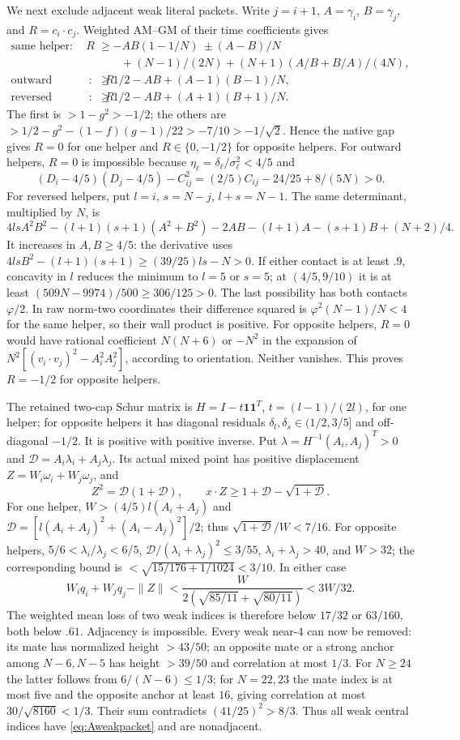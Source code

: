 \documentclass[11pt]{article}
\theoremstyle{remark}
\newcommand{\ph}{\varphi}
\begin{document}
We next exclude adjacent weak literal packets. Write $j=i+1$,
$A=\gamma_i$, $B=\gamma_j$, and $R=c_i\cdot c_j$.
Weighted AM--GM of their time coefficients gives
\[
\begin{aligned}
\text{same helper}:\quad R&\ge-AB(1-1/N)\ \pm(A-B)/N\\
 &\qquad +(N-1)/(2N)+(N+1)(A/B+B/A)/(4N),\\
\text{outward helpers}:\quad R&\ge1/2-AB+(A-1)(B-1)/N,\\
\text{reversed helpers}:\quad R&\ge1/2-AB+(A+1)(B+1)/N.
\end{aligned}
\]
The first is $>1-g^2>-1/2$; the others are
$>1/2-g^2-(1-f)(g-1)/22>-7/10>-1/\sqrt2$.
Hence the native gap gives $R=0$ for one helper and
$R\in\{0,-1/2\}$ for opposite helpers.
For outward helpers, $R=0$ is impossible because
$\eta_\ell=\delta_\ell/\sigma_\ell^2<4/5$ and
\[
 (D_i-4/5)(D_j-4/5)-C_{ij}^2
       =(2/5)C_{ij}-24/25+8/(5N)>0.
\]
For reversed helpers, put $l=i$, $s=N-j$, $l+s=N-1$.
The same determinant, multiplied by $N$, is
\[
 4lsA^2B^2-(l+1)(s+1)(A^2+B^2)-2AB
 -(l+1)A-(s+1)B+(N+2)/4.
\]
It increases in $A,B\ge4/5$: the derivative uses
$4lsB^2-(l+1)(s+1)\ge(39/25)ls-N>0$.
If either contact is at least $.9$, concavity in $l$ reduces the
minimum to $l=5$ or $s=5$; at $(4/5,9/10)$ it is at least
$(509N-9974)/500\ge306/125>0$.
The last possibility has both contacts $\ph/2$.
In raw norm-two coordinates their difference squared is
$\ph^2(N-1)/N<4$ for the same helper, so their wall product is
positive. For opposite helpers, $R=0$ would have rational coefficient
$N(N+6)$ or $-N^2$ in the expansion of
$N^2[(v_i\cdot v_j)^2-A_i^2A_j^2]$, according to orientation.
Neither vanishes. This proves $R=-1/2$ for opposite helpers.

The retained two-cap Schur matrix is
$H=I-t\mathbf1\mathbf1^T$, $t=(l-1)/(2l)$, for one helper;
for opposite helpers it has diagonal residuals
$\delta_l,\delta_s\in(1/2,3/5]$ and off-diagonal $-1/2$.
It is positive with positive inverse. Put
$\lambda=H^{-1}(A_i,A_j)^T>0$ and
$\mathcal D=A_i\lambda_i+A_j\lambda_j$.
Its actual mixed point has positive displacement
$Z=W_i\omega_i+W_j\omega_j$, and
\[
 Z^2=\mathcal D(1+\mathcal D),\qquad
 x\cdot Z\ge1+\mathcal D-\sqrt{1+\mathcal D}.
\]
For one helper, $W>(4/5)l(A_i+A_j)$ and
$\mathcal D=[l(A_i+A_j)^2+(A_i-A_j)^2]/2$;
thus $\sqrt{1+\mathcal D}/W<7/16$.
For opposite helpers, $5/6<\lambda_i/\lambda_j<6/5$,
$\mathcal D/(\lambda_i+\lambda_j)^2\le3/55$,
$\lambda_i+\lambda_j>40$, and $W>32$;
the corresponding bound is $<\sqrt{15/176+1/1024}<3/10$.
In either case
\[
 W_iq_i+W_jq_j-\|Z\|
 <\frac{W}{2(\sqrt{85/11}+\sqrt{80/11})}<3W/32.
\]
The weighted mean loss of two weak indices is therefore below
$17/32$ or $63/160$, both below $.61$. Adjacency is impossible.
Every weak near-$4$ can now be removed: its mate has normalized
height $>43/50$; an opposite mate or a strong anchor among
$N-6,N-5$ has height $>39/50$ and correlation at most $1/3$.
For $N\ge24$ the latter follows from $6/(N-6)\le1/3$;
for $N=22,23$ the mate index is at most five and the opposite
anchor at least $16$, giving correlation at most
$30/\sqrt{8160}<1/3$.
Their sum contradicts $(41/25)^2>8/3$.
Thus all weak central indices have \eqref{eq:Aweakpacket} and
are nonadjacent.
\end{document}
